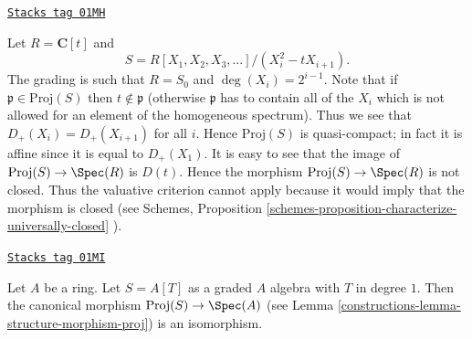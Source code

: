 \begin{example}
\label{constructions-example-not-existence-valuative-small-proj}
\href{https://stacks.math.columbia.edu/tag/01MH}{\texttt{Stacks tag 01MH}}

Let $R = \mathbf{C}[t]$ and
$$
S = R[X_1, X_2, X_3, \ldots]/(X_i^2 - tX_{i + 1}).
$$
The grading is such that $R = S_0$ and $\deg(X_i) = 2^{i - 1}$.
Note that if $\mathfrak p \in \text{Proj}(S)$ then
$t \not \in \mathfrak p$ (otherwise $\mathfrak p$ has to contain
all of the $X_i$ which is not allowed for an element of
the homogeneous spectrum). Thus we see that
$D_{+}(X_i) = D_{+}(X_{i + 1})$ for all $i$. Hence
$\text{Proj}(S)$ is quasi-compact; in fact it is affine
since it is equal to $D_{+}(X_1)$. It is easy to see that
the image of $\text{Proj}(S) \to \Spec(R)$ is
$D(t)$. Hence the morphism $\text{Proj}(S) \to \Spec(R)$
is not closed. Thus the valuative criterion cannot apply because
it would imply that the morphism is closed (see
Schemes, Proposition \ref{schemes-proposition-characterize-universally-closed}
).
\end{example}

\begin{example}
\label{constructions-example-trivial-proj}
\href{https://stacks.math.columbia.edu/tag/01MI}{\texttt{Stacks tag 01MI}}

Let $A$ be a ring.
Let $S = A[T]$ as a graded $A$ algebra with $T$ in degree $1$.
Then the canonical morphism $\text{Proj}(S) \to \Spec(A)$
(see Lemma \ref{constructions-lemma-structure-morphism-proj})
is an isomorphism.
\end{example}

